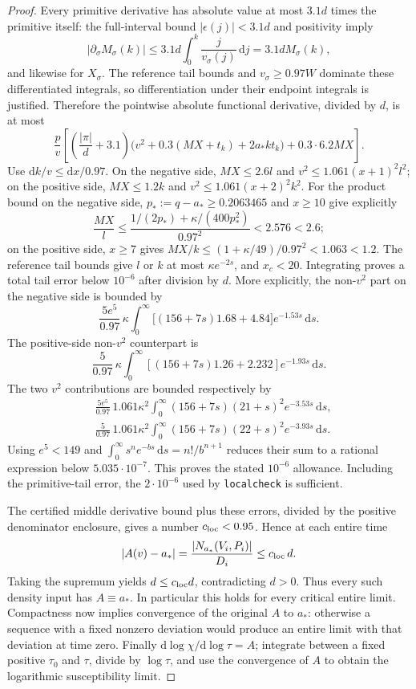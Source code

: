 \documentclass[11pt,a4paper]{article}
\numberwithin{equation}{section}
\theoremstyle{definition}
\theoremstyle{remark}
\newcommand{\dd}{\mathrm d}
\begin{document}
\begin{proof}
Every primitive derivative has absolute value at most $3.1d$ times
the primitive itself: the full-interval bound
$|\epsilon(j)|<3.1d$ and positivity imply
\[
 |\partial_\sigma M_\sigma(k)|
 \le3.1d\int_0^k\frac j{v_\sigma(j)}\,\dd j
 =3.1dM_\sigma(k),
\]
and likewise for $X_\sigma$.  The reference tail bounds and
$v_\sigma\ge0.97W$ dominate these differentiated integrals, so
differentiation under their endpoint integrals is justified.
Therefore the pointwise absolute functional
derivative, divided by $d$, is at most
\[
 \frac pv\left[
 \left(\frac{|\pi|}{d}+3.1\right)
    \bigl(v^2+0.3(MX+t_k)+2a_*kt_k\bigr)
       +0.3\cdot6.2MX\right].
\]
Use $\dd k/v\le\dd x/0.97$.  On the negative side,
$MX\le2.6l$ and $v^2\le1.061(x+1)^2l^2$; on the positive side,
$MX\le1.2k$ and $v^2\le1.061(x+2)^2k^2$.
For the product bound on the negative side,
$p_*:=q-a_*\ge0.2063465$ and $x\ge10$ give explicitly
\[
 \frac{MX}{l}\le
 \frac{1/(2p_*)+\kappa/(400p_*^2)}{0.97^2}<2.576<2.6;
\]
on the positive side, $x\ge7$ gives
$MX/k\le(1+\kappa/49)/0.97^2<1.063<1.2$.
The reference tail bounds give $l$ or $k$ at most
$\kappa e^{-2s}$, and $x_c<20$.  Integrating proves a total tail
error below $10^{-6}$ after division by $d$.  More explicitly, the
non-$v^2$ part on the negative side is bounded by
\[
 \frac{5e^5}{0.97}\,\kappa
 \int_0^\infty\bigl[(156+7s)1.68+4.84\bigr]e^{-1.53s}\,\dd s.
\]
The positive-side non-$v^2$ counterpart is
\[
 \frac5{0.97}\,\kappa
 \int_0^\infty[(156+7s)1.26+2.232]e^{-1.93s}\,\dd s.
\]
The two $v^2$ contributions are bounded respectively by
\[
 \begin{split}
 &\frac{5e^5}{0.97}\,1.061\kappa^2
  \int_0^\infty(156+7s)(21+s)^2e^{-3.53s}\,\dd s,\\
 &\frac5{0.97}\,1.061\kappa^2
  \int_0^\infty(156+7s)(22+s)^2e^{-3.93s}\,\dd s.
 \end{split}
\]
Using $e^5<149$ and
$\int_0^\infty s^n e^{-bs}\,\dd s=n!/b^{n+1}$ reduces their sum
to a rational expression below $5.035\cdot10^{-7}$.
This proves the stated $10^{-6}$ allowance.
Including the primitive-tail error, the $2\cdot10^{-6}$ used by
\texttt{localcheck} is sufficient.

The certified middle derivative bound plus these errors, divided by
the positive denominator enclosure, gives a number
$c_{\rm loc}<0.95$.  Hence at each entire time
\[
 |A(v)-a_*|=\frac{|N_{a_*}(V_i,P_i)|}{D_i}
 \le c_{\rm loc}\,d.
\]
Taking the supremum yields $d\le c_{\rm loc}d$, contradicting $d>0$.
Thus every such density input has $A\equiv a_*$.  In particular this
holds for every critical entire limit.  Compactness now implies
convergence of the original $A$ to $a_*$: otherwise a sequence with a
fixed nonzero deviation would produce an entire limit with that
deviation at time zero.  Finally
$\dd\log\chi/\dd\log\tau=A$; integrate between a fixed positive
$\tau_0$ and $\tau$, divide by $\log\tau$, and use the convergence of
$A$ to obtain the logarithmic susceptibility limit.


\end{proof}
\end{document}

